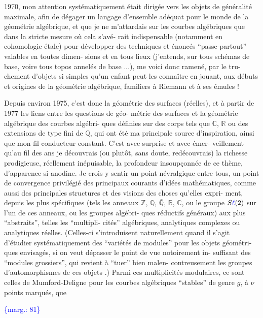 \documentclass[11pt]{article}
\newcommand{\scanpage}[1]{\par\bigskip\noindent{\small\sffamily[scan #1]}\par}
\newcommand{\mspage}[1]{{\small\sffamily[p.\,#1]}}
\newcommand{\hand}[1]{\textcolor{blue}{#1}}
\newcommand{\margin}[1]{\textcolor{blue}{\{\textsf{marg.:} #1\}}}
\begin{document}
1970, mon attention systématiquement était dirigée vers les objets
de généralité maximale, afin de dégager un langage d'ensemble adéquat
pour le monde de la géométrie algébrique, et que je ne m'attardais
sur les courbes algébriques que dans la stricte mesure où cela s'avé-%
rait indispensable (notamment en cohomologie étale) pour développer
des techniques et énoncés ``passe-partout'' valables en toutes dimen-%
sions et en tous lieux (j'entends, sur tous schémas de base, voire
tous topos annelés de base ...), me voici donc ramené, par le tru-%
chement d'objets si simples qu'un enfant peut les connaître en jouant,
aux débuts et origines de la géométrie algébrique, familiers à Riemann
et à ses émules !

Depuis environ 1975, c'est donc la géométrie des surfaces
(réelles), et à partir de 1977 les liens entre les questions de géo-%
métrie des surfaces et la géométrie algébrique des courbes algébri-%
ques définies sur des corps tels que $\mathbb{C}$, $\mathbb{R}$ ou des extensions de type
fini de $\mathbb{Q}$, qui ont été ma principale source d'inspiration, ainsi
que mon fil conducteur constant. C'est avec surprise et avec émer-%
veillement qu'au fil des ans je découvrais (ou plutôt, sans doute,
redécouvrais) la richesse prodigieuse, réellement inépuisable, la
profondeur insoupçonnée de ce thème, d'apparence si anodine. Je crois
y sentir un point névralgique entre tous, un point de convergence
privilégié des principaux courants d'idées mathématiques, comme aussi
des principales structures et des visions des choses qu'elles expri-%
ment, depuis les plus spécifiques (tels les anneaux $\mathbb{Z}$, $\mathbb{Q}$, $\bar{\mathbb{Q}}$, $\mathbb{R}$, $\mathbb{C}$,
ou le groupe $S\hand{\ell}(2)$ sur l'un de ces anneaux, ou les groupes algébri-%
ques réductifs généraux) aux plus ``abstraits'', telles les ``multipli-%
cités'' algébriques, analytiques complexes ou analytiques réelles.
(Celles-ci s'introduisent naturellement quand il s'agit d'étudier
systématiquement des ``variétés de modules'' pour les objets géométri-%
ques envisagés, si on veut dépasser le point de vue notoirement in-%
suffisant des ``modules grossiers'', qui revient à ``tuer'' bien malen-%
contreusement les groupes d'automorphismes de ces objets .) Parmi ces
multiplicités modulaires, ce sont celles de Mumford-Deligne pour les
courbes algébriques ``stables'' de genre $g$, à $\nu$ points marqués, que

\margin{81}

\clearpage
\scanpage{119/82}
\mspage{4}
\end{document}
